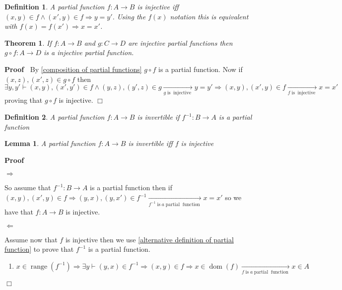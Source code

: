 \documentclass{book}
\newcommand{\Rightarrowlim}{\mathop{\rightarrow}\limits}
\newcommand{\tmop}[1]{\ensuremath{\operatorname{#1}}}
\newcommand{\um}{-}
\newenvironment{proof}{\noindent\textbf{Proof\ }}{\hspace*{\fill}$\Box$\medskip}
\newtheorem{definition}{Definition}
{\theorembodyfont{\rmfamily}\newtheorem{example}{Example}}
\newtheorem{lemma}{Lemma}
\newtheorem{theorem}{Theorem}
\begin{document}
{{\begin{definition}
  A partial function $f : A \rightarrow B$ is injective iff $(x, y) \in f
  \wedge (x', y) \in f \Rightarrow y = y'$. Using the $f (x)$ notation this is
  equivalent with $f (x) = f (x') \Rightarrow x = x'$.
\end{definition}

\begin{theorem}
  \label{composition of injective partial functions}If $f : A \rightarrow B$
  and $g : C \rightarrow D$ are injective partial functions then $g \circ f :
  A \rightarrow D$ is a injective partial function.
\end{theorem}

\begin{proof}
  By \ref{composition of partial functions} $g \circ f$ is a partial function.
  Now if $(x, z), (x', z) \in g \circ f$ then $\exists y, y' \vdash (x, y),
  (x', y') \in f \wedge (y, z), (y', z) \in g \Rightarrowlim_{g \tmop{is}
  \tmop{injective}} y = y' \Rightarrow (x, y), (x', y) \in f \Rightarrowlim_{f
  \tmop{is} \tmop{injective}} x = x'$ proving that $g \circ f$ is injective.
\end{proof}

\begin{definition}
  A partial function $f : A \rightarrow B$ is invertible if $f^{\um 1} : B
  \rightarrow A$ is a partial function
\end{definition}

\begin{lemma}
  \label{condition for invertible partial functions}A partial function $f : A
  \rightarrow B$ is invertible iff $f$ is injective
\end{lemma}

\begin{proof}
  
  
  $\Rightarrow$
  
  So assume that $f^{\um 1} : B \rightarrow A$ is a partial function then if
  $(x, y), (x', y) \in f \Rightarrow (y, x), (y, x') \in f^{- 1}
  \Rightarrowlim_{f^{- 1} \tmop{is} a \tmop{partial} \tmop{function}} x = x'$
  so we have that $f : A \rightarrow B$ is injective.
  
  $\Leftarrow$
  
  Assume now that $f$ is injective then we use \ref{alternative definition of
  partial function} to prove that $f^{- 1}$ is a partial function.
  \begin{enumerate}
    \item $x \in \tmop{range} (f^{- 1}) \Rightarrow \exists y \vdash (y, x)
    \in f^{- 1} \Rightarrow (x, y) \in f \Rightarrow x \in \tmop{dom} (f)
    \Rightarrowlim_{f \tmop{is} a \tmop{partial} \tmop{function}} x \in A$
    

\end{enumerate}
\end{proof}}}
\end{document}
